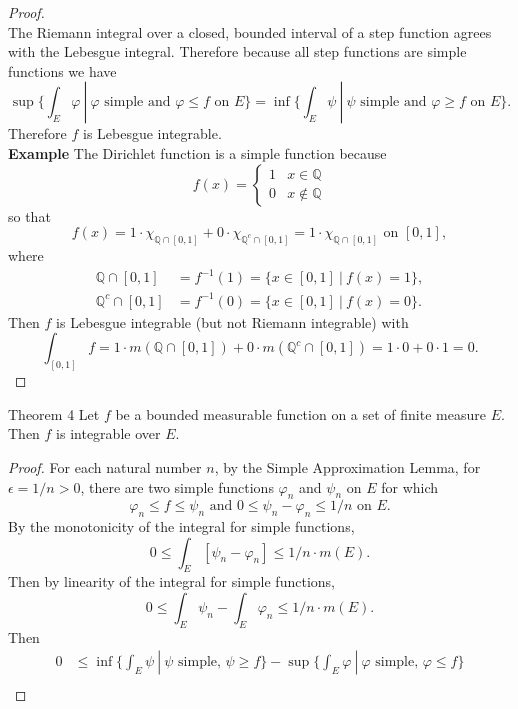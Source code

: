 \begin{flushleft}
\begin{proof}
\[        \]
        The Riemann integral over a closed, bounded interval of a step function agrees with the Lebesgue integral.
        Therefore because all step functions are simple functions we have 
        \[
            \sup\biggl\{\int_E\varphi\ |\ \varphi\text{ simple and }\varphi\le f\text{ on }E\biggr\}=\inf\biggl\{\int_E\psi\ |\ \psi\text{ simple and }\varphi\ge f\text{ on }E\biggr\}.
        \]
        Therefore $f$ is Lebesgue integrable.
        \\\bigskip
        \textbf{Example} The Dirichlet function is a simple function because 
        \[
        f(x)=
        \begin{cases}
            1&x\in\mathbb{Q}\\
            0&x\notin\mathbb{Q}
        \end{cases}    
        \] 
        so that 
        \[
            f(x)=1\cdot\chi_{\mathbb{Q}\cap[0,1]}+0\cdot\chi_{\mathbb{Q}^c\cap[0,1]}=1\cdot\chi_{\mathbb{Q}\cap[0,1]}\text{ on }[0,1],
        \]
        where
        \begin{align*}
            \mathbb{Q}\cap[0,1]&=f^{-1}(1)=\{x\in [0,1]\ |\ f(x)=1\},\\
            \mathbb{Q}^c\cap[0,1]&=f^{-1}(0)=\{x\in [0,1]\ |\ f(x)=0\}.
        \end{align*}
        Then $f$ is Lebesgue integrable (but not Riemann integrable) with
        \[
            \int_{[0,1]}f=1\cdot m(\mathbb{Q}\cap[0,1])+0\cdot m(\mathbb{Q}^c\cap[0,1])=1\cdot0+0\cdot1=0.
        \]
    \end{proof}
    \begin{namedthm*}{Theorem 4}    
        Let $f$ be a bounded measurable function on a set of finite measure $E$.
        Then $f$ is integrable over $E$.
    \end{namedthm*}
    \begin{proof}
        For each natural number $n$, by the Simple Approximation Lemma, for $\epsilon=1/n>0$, there are two simple functions $\varphi_n$ and $\psi_n$ on $E$ for which
        \[
            \varphi_n\le f\le\psi_n\text{ and }0\le\psi_n-\varphi_n\le1/n\text{ on }E.    
        \]
        By the monotonicity of the integral for simple functions,
        \[
            0\le\int_E[\psi_n-\varphi_n]\le1/n\cdot m(E).       
        \]
        Then by linearity of the integral for simple functions,
        \[
            0\le\int_E\psi_n-\int_E\varphi_n\le1/n\cdot m(E).       
        \]
        Then 
        \begin{align*}
            0&\le\inf\biggl\{\int_E\psi\ |\ \psi\text{ simple, }\psi\ge f\biggr\}-\sup\biggl\{\int_E\varphi\ |\ \varphi\text{ simple, }\varphi\le f\biggr\}\\

\end{align*}
\end{proof}
\end{flushleft}

